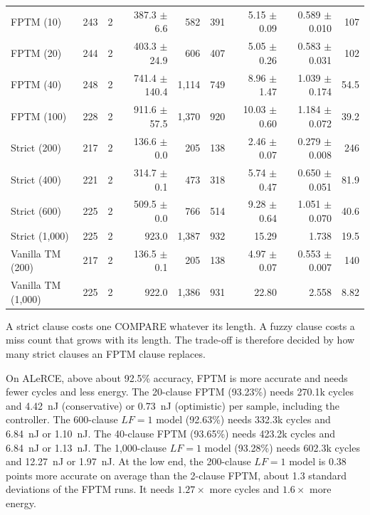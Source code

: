 \documentclass[preprint,review,12pt]{elsarticle}
\newcommand{\hyp}[1]{#1}   %
\newcommand{\LF}{\mathit{LF}}
\begin{document}
\begin{table}
\begin{tabular}{lrrrrrrrr}
FPTM (10) & 243 & 2 & 387.3 $\pm$ 6.6 & \hyp{582} & \hyp{391} & \hyp{5.15 $\pm$ 0.09} & \hyp{0.589 $\pm$ 0.010} & \hyp{107} \\
FPTM (20) & 244 & 2 & 403.3 $\pm$ 24.9 & \hyp{606} & \hyp{407} & \hyp{5.05 $\pm$ 0.26} & \hyp{0.583 $\pm$ 0.031} & \hyp{102} \\
FPTM (40) & 248 & 2 & 741.4 $\pm$ 140.4 & \hyp{1,114} & \hyp{749} & \hyp{8.96 $\pm$ 1.47} & \hyp{1.039 $\pm$ 0.174} & \hyp{54.5} \\
FPTM (100) & 228 & 2 & 911.6 $\pm$ 57.5 & \hyp{1,370} & \hyp{920} & \hyp{10.03 $\pm$ 0.60} & \hyp{1.184 $\pm$ 0.072} & \hyp{39.2} \\
Strict (200) & 217 & 2 & 136.6 $\pm$ 0.0 & \hyp{205} & \hyp{138} & \hyp{2.46 $\pm$ 0.07} & \hyp{0.279 $\pm$ 0.008} & \hyp{246} \\
Strict (400) & 221 & 2 & 314.7 $\pm$ 0.1 & \hyp{473} & \hyp{318} & \hyp{5.74 $\pm$ 0.47} & \hyp{0.650 $\pm$ 0.051} & \hyp{81.9} \\
Strict (600) & 225 & 2 & 509.5 $\pm$ 0.0 & \hyp{766} & \hyp{514} & \hyp{9.28 $\pm$ 0.64} & \hyp{1.051 $\pm$ 0.070} & \hyp{40.6} \\
Strict (1,000) & 225 & 2 & 923.0 & \hyp{1,387} & \hyp{932} & \hyp{15.29} & \hyp{1.738} & \hyp{19.5} \\
Vanilla TM (200) & 217 & 2 & 136.5 $\pm$ 0.1 & \hyp{205} & \hyp{138} & \hyp{4.97 $\pm$ 0.07} & \hyp{0.553 $\pm$ 0.007} & \hyp{140} \\
Vanilla TM (1,000) & 225 & 2 & 922.0 & \hyp{1,386} & \hyp{931} & \hyp{22.80} & \hyp{2.558} & \hyp{8.82} \\
\bottomrule
\end{tabular}
\end{table}


A strict clause costs one COMPARE whatever its length.
A fuzzy clause costs a miss count that grows with its length.
The trade-off is therefore decided by how many strict clauses an FPTM clause replaces.

On ALeRCE, above about 92.5\% accuracy, FPTM is more accurate and needs fewer cycles and less energy.
The 20-clause FPTM (93.23\%) needs 270.1k cycles and \hyp{4.42~nJ (conservative) or 0.73~nJ (optimistic)} per sample, including the controller.
The 600-clause $\LF=1$ model (92.63\%) needs 332.3k cycles and \hyp{6.84~nJ or 1.10~nJ}.
The 40-clause FPTM (93.65\%) needs 423.2k cycles and \hyp{6.84~nJ or 1.13~nJ}. The 1,000-clause $\LF=1$ model (93.28\%) needs 602.3k cycles and \hyp{12.27~nJ or 1.97~nJ}.
At the low end, the 200-clause $\LF=1$ model is 0.38 points more accurate on average than the 2-clause FPTM, about 1.3 standard deviations of the FPTM runs. It needs $1.27\times$ more cycles and \hyp{$1.6\times$} more energy.
\end{document}
